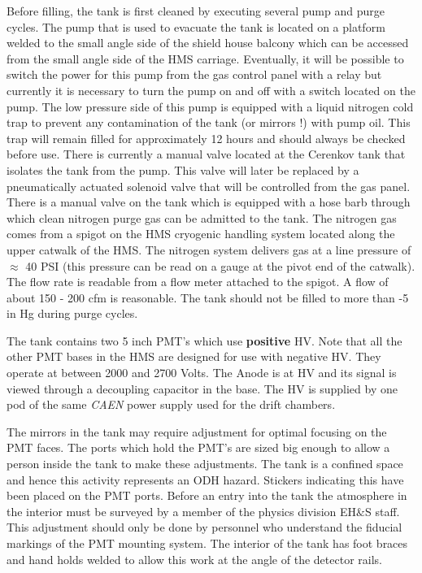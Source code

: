 Before filling, the tank is first cleaned by executing several pump
and purge cycles. The pump that is used to evacuate the tank is located on a
platform welded to the small angle side of the shield house balcony
which can be accessed from the small angle side of the HMS carriage.
Eventually, it will be possible to switch the power for this pump
from the gas control panel with a relay but currently it
is necessary to turn the pump on and off with a switch located on the pump.
The low pressure side of this pump is equipped with a liquid nitrogen
cold trap to prevent any contamination of the tank (or mirrors !)
with pump oil. This trap will remain filled for approximately
12 hours and should always be checked before use. There is currently
a manual valve located at the Cerenkov tank that isolates the tank from
the pump.  This valve will later be replaced by a pneumatically actuated
solenoid valve that will be controlled from the gas panel.
There is a manual valve on the tank which is equipped with a hose
barb through which clean nitrogen purge gas can be admitted to the tank.
The nitrogen gas comes from a spigot on the HMS cryogenic handling system
located along the upper catwalk of the HMS. The nitrogen system
delivers gas at a line pressure of $\approx$ 40 PSI (this pressure can
be read on a gauge at the pivot end of the catwalk). The flow
rate is readable from a flow meter attached to the spigot. A flow of
about 150 - 200 cfm is reasonable. The tank should not be filled to
more than -5 in Hg during purge cycles.

The tank contains two 5 inch PMT's which use {\bf positive} HV.
Note that all the other PMT bases in the HMS are designed for use with
negative HV. They operate
at between 2000 and 2700 Volts. The Anode is at HV and its signal is
viewed through a decoupling capacitor in the base. The HV is supplied
by one pod of the same {\em CAEN} power supply used for the drift chambers.

The mirrors in the tank may require adjustment for optimal focusing
on the PMT faces. The ports which hold the PMT's are sized big enough to allow
a person inside the tank to make these adjustments. The tank is a confined
space and hence this activity represents an ODH hazard. Stickers indicating
this have been placed on the PMT ports. Before an entry into the tank the
atmosphere in the interior must be surveyed by a member of the physics
division EH$\&$S staff.
This adjustment should only
be done by personnel who understand the fiducial markings of the PMT
mounting system. The interior of the tank has foot braces and hand holds welded
to allow this work at the angle of the detector rails.

